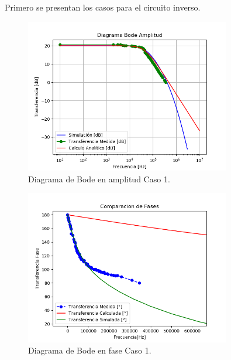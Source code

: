 Primero se presentan los casos para el circuito inverso.
\begin{figure}[H]	
	\centering
	\includegraphics[width=0.8\textwidth]{Ejercicio1/Imagenes/BodeC1.png}
	\caption{Diagrama de Bode en amplitud Caso 1.}
	\label{fig:BodeC1}
\end{figure} 
\begin{figure}[H]	
	\centering
	\includegraphics[width=0.8\textwidth]{Ejercicio1/Imagenes/BodephC1.png}
	\caption{Diagrama de Bode en fase Caso 1.}
	\label{fig:BodephC1}
\end{figure} 

